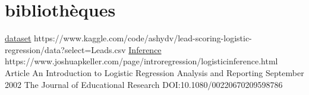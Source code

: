 \chapter*{bibliothèques}
\href{https://www.kaggle.com/code/ashydv/lead-scoring-logistic-regression/data?select=Leads.csv}{dataset}
\newline
{https://www.kaggle.com/code/ashydv/lead-scoring-logistic-regression/data?select=Leads.csv}
\href{https://www.joshuapkeller.com/page/introregression/logisticinference.html}{Inference}
\newline
{https://www.joshuapkeller.com/page/introregression/logisticinference.html}
\newline
Article
\newline
An Introduction to Logistic Regression Analysis and Reporting
\newline
September 2002 The Journal of Educational Research DOI:10.1080/00220670209598786
